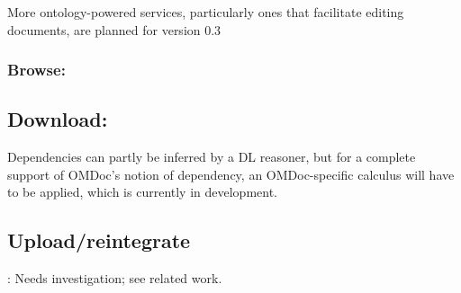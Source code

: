 
More ontology-powered services, particularly ones that facilitate editing
documents, are planned for version 0.3\cite{swim-roadmap,Lange:SWiMSciColl07}

\subsubsection{Browse: }


\subsection{Download:}

Dependencies can partly be inferred by a DL reasoner, but for a complete support
of OMDoc's notion of dependency, an OMDoc-specific calculus will have to be
applied, which is currently in development.

\subsection{Upload/reintegrate}: Needs investigation; see related work.

